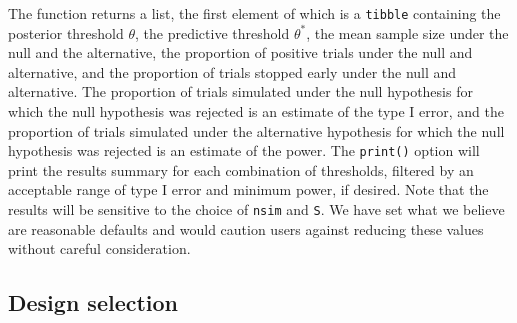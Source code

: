 The function returns a list, the first element of which is a
\texttt{tibble} containing the posterior threshold \(\theta\), the
predictive threshold \(\theta^*\), the mean sample size under the null
and the alternative, the proportion of positive trials under the null
and alternative, and the proportion of trials stopped early under the
null and alternative. The proportion of trials simulated under the null
hypothesis for which the null hypothesis was rejected is an estimate of
the type I error, and the proportion of trials simulated under the
alternative hypothesis for which the null hypothesis was rejected is an
estimate of the power. The \texttt{print()} option will print the
results summary for each combination of thresholds, filtered by an
acceptable range of type I error and minimum power, if desired. Note
that the results will be sensitive to the choice of \texttt{nsim} and
\texttt{S}. We have set what we believe are reasonable defaults and
would caution users against reducing these values without careful
consideration.

\hypertarget{design-selection}{%
\subsection{Design selection}\label{design-selection}}

